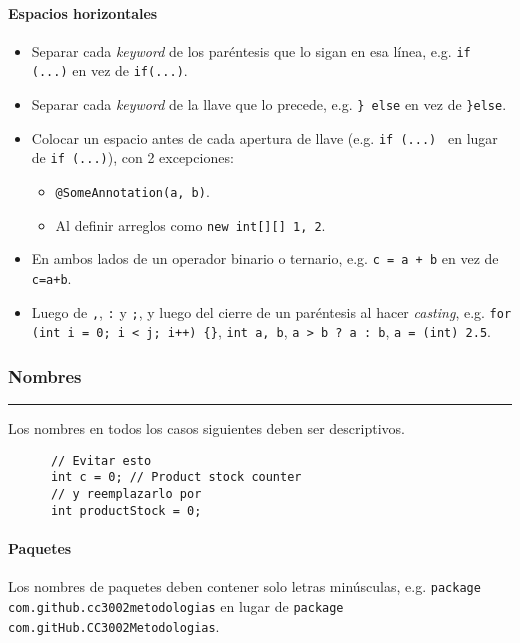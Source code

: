     \paragraph{Espacios horizontales}
      \begin{itemize}
        \item Separar cada \textit{keyword} de los paréntesis que lo sigan en esa línea, 
          e.g. \texttt{if (...)} en vez de \texttt{if(...)}.
        \item Separar cada \textit{keyword} de la llave que lo precede, e.g. 
          \texttt{\} else} en vez de \texttt{\}else}.
        \item Colocar un espacio antes de cada apertura de llave (e.g. 
          \texttt{if (...) {}} en lugar de \texttt{if (...){}}), con 2 
          excepciones:

          \begin{itemize}
            \item \texttt{@SomeAnnotation({a, b})}.
            \item Al definir arreglos como \texttt{new int[][] {{1, 2}}}.
          \end{itemize}
        \item En ambos lados de un operador binario o ternario, e.g. 
          \texttt{c = a + b} en vez de \texttt{c=a+b}.
        \item Luego de \texttt{,}, \texttt{:} y \texttt{;}, y luego del cierre de un 
          paréntesis al hacer \textit{casting}, e.g. 
          \texttt{for (int i = 0; i < j; i++) \{\}}, \texttt{int a, b},
          \texttt{a > b ? a : b}, \texttt{a = (int) 2.5}.
      \end{itemize}
  \subsubsection{Nombres}
    \vspace{-3ex}\rule{\linewidth}{1pt}

    Los nombres en todos los casos siguientes deben ser descriptivos.
    
    \begin{verbatim}
      // Evitar esto
      int c = 0; // Product stock counter
      // y reemplazarlo por
      int productStock = 0;
    \end{verbatim}

    \paragraph{Paquetes}
      Los nombres de paquetes deben contener solo letras minúsculas, e.g. 
      \texttt{package com.github.cc3002metodologias} en lugar de
      \texttt{package com.gitHub.CC3002Metodologias}.
